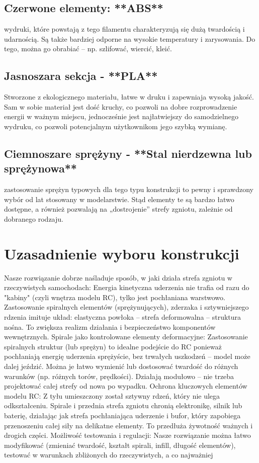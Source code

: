 \documentclass[a4paper,12pt]{article}  %
\begin{document}
\subsection{Czerwone elementy: **ABS**}
wydruki, które powstają z tego filamentu charakteryzują się dużą
twardością i udarnością. Są także bardziej odporne na wysokie temperatury i zarysowania. Do
tego, można go obrabiać – np. szlifować, wiercić, kleić.

\subsection{Jasnoszara sekcja - **PLA**}
Stworzone z ekologicznego materiału, łatwe w druku i zapewniaja wysoką
jakość. Sam w sobie materiał jest dość kruchy, co pozwoli na dobre rozprowadzenie energii w
ważnym miejscu, jednocześnie jest najłatwiejszy do samodzielnego wydruku, co pozwoli
potencjalnym użytkownikom jego szybką wymianę.

\subsection{Ciemnoszare sprężyny - **Stal nierdzewna lub sprężynowa**}
zastosowanie sprężyn typowych
dla tego typu konstrukcji to pewny i sprawdzony wybór od lat stosowany w modelarstwie. Stąd
elementy te są bardzo łatwo dostępne, a również pozwalają na „dostrojenie” strefy zgniotu,
zależnie od dobranego rodzaju.

\section{Uzasadnienie wyboru konstrukcji}

Nasze rozwiązanie dobrze naśladuje sposób, w jaki działa strefa zgniotu w rzeczywistych
samochodach:
\smallbreak
Energia kinetyczna uderzenia nie trafia od razu do "kabiny" (czyli wnętrza modelu RC), tylko jest
pochłaniana warstwowo. Zastosowanie spiralnych elementów (sprężynujących), zderzaka i
sztywniejszego rdzenia imituje układ: elastyczna powłoka – strefa deformowalna – struktura
nośna. To zwiększa realizm działania i bezpieczeństwo komponentów wewnętrznych.
\smallbreak
Spirale jako kontrolowane elementy deformacyjne:
\smallbreak
Zastosowanie spiralnych struktur (lub sprężyn) to idealne podejście do RC ponieważ pochłaniają
energię uderzenia sprężyście, bez trwałych uszkodzeń – model może dalej jeździć. Można je łatwo
wymienić lub dostosować twardość do różnych warunków (np. różnych torów, prędkości).
Działają modułowo – nie trzeba projektować całej strefy od nowa po wypadku.
\smallbreak
Ochrona kluczowych elementów modelu RC:
\smallbreak
Z tyłu umieszczony został sztywny rdzeń, który nie ulega odkształceniu. Spirale i przednia strefa
zgniotu chronią elektronikę, silnik lub baterię, działając jak strefa pochłaniająca uderzenie i bufor,
który zapobiega przenoszeniu całej siły na delikatne elementy. To przedłuża żywotność ważnych i
drogich części.
\smallbreak
Możliwość testowania i regulacji:
\smallbreak
Nasze rozwiązanie można łatwo modyfikować (zmieniać twardość, kształt spirali, infill, długość
elementów), testować w warunkach zbliżonych do rzeczywistych, a co najważniej


\printbibliography
\end{document}
